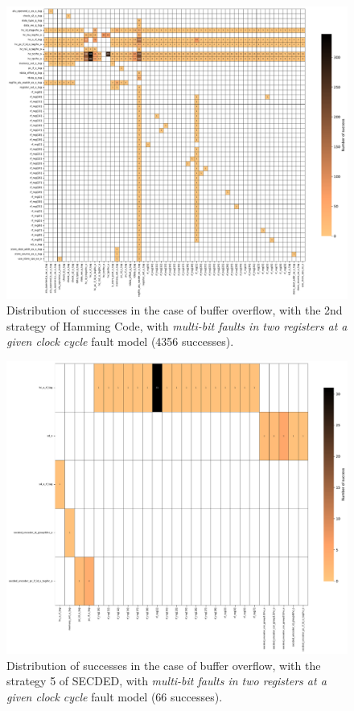 \begin{figure}[ht]
    \centering
    \includegraphics[width=.97\textwidth]{c6_group_composition/img/heatmap_buffer_overflow_hamming_2_multi_bitflip_reg_multi_2.pdf}
    \caption{Distribution of successes in the case of buffer overflow, with the 2nd strategy of Hamming Code, with \textit{multi-bit faults in two registers at a given clock cycle} fault model (4356 successes).}
    \label{fig:heatmap_bo_multireg_hc2}
\end{figure}

\begin{figure}[ht]
    \centering
    \includegraphics[width=\textwidth]{c6_group_composition/img/heatmap_buffer_overflow_secded_5_multi_bitflip_reg_multi_2.pdf}
    \caption{Distribution of successes in the case of buffer overflow, with the strategy 5 of SECDED, with \textit{multi-bit faults in two registers at a given clock cycle} fault model (66 successes).}
    \label{fig:heatmap_bo_multireg_sd5}
\end{figure}

